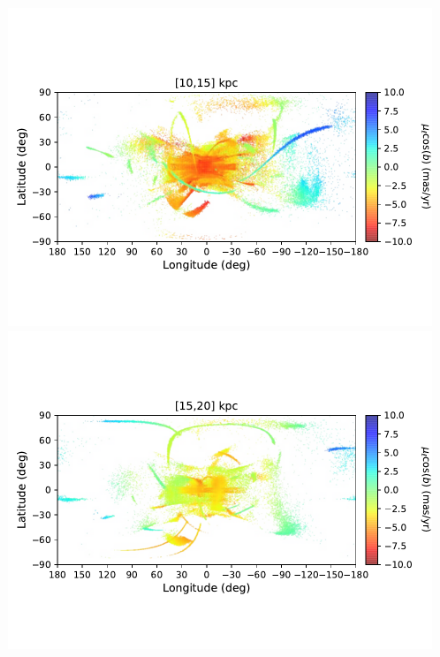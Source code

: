 \begin{figure}[h!]
\begin{center}
            \includegraphics[clip=true, trim = 0mm 20mm 0mm 20mm, width=\columnwidth]{images/PII_ensemble_LB_D10-15_PML_new.pdf}
            \includegraphics[clip=true, trim = 0mm 20mm 0mm 20mm, width=\columnwidth]{images/PII_ensemble_LB_D15-20_PML_new.pdf}


\end{center}
\end{figure}
